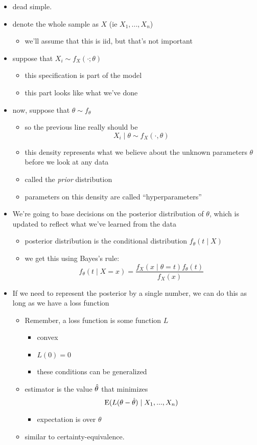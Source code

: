 \begin{itemize}
\item dead simple.
\item denote the whole sample as $X$ (ie $X_1,...,X_n$)
\begin{itemize}
\item we'll assume that this is iid, but that's not important
\end{itemize}
\item suppose that $X_i \sim f_X(\cdot; \theta)$
\begin{itemize}
\item this specification is part of the model
\item this part looks like what we've done
\end{itemize}
\item now, suppose that $\theta \sim f_\theta$
\begin{itemize}
\item so the previous line really should be
  \[X_i \mid \theta \sim f_X(\cdot, \theta)\]
\item this density represents what we believe about the unknown
  parameters $\theta$ before we look at any data
\item called the \emph{prior} distribution
\item parameters on this density are called ``hyperparameters''
\end{itemize}
\item We're going to base decisions on the posterior distribution of
  $\theta$, which is updated to reflect what we've learned from the data
\begin{itemize}
\item posterior distribution is the conditional distribution
  $f_\theta(t \mid X)$
\item we get this using Bayes's rule:
  \[f_\theta(t \mid X = x) = \frac{f_X(x \mid \theta = t) f_\theta(t)}{f_X(x)}\]
\end{itemize}
\item If we need to represent the posterior by a single number, we
       can do this as long as we have a loss function
\begin{itemize}
\item Remember, a loss function is some function $L$
\begin{itemize}
\item convex
\item $L(0) = 0$
\item these conditions can be generalized
\end{itemize}
\item estimator is the value $\hat{\theta}$ that minimizes
  \[ \operatorname{E}(L(\theta - \hat{\theta}) \mid X_1,...,X_n) \]
\begin{itemize}
\item expectation is over $\theta$
\end{itemize}
\item similar to certainty-equivalence.
\end{itemize}
\end{itemize}

